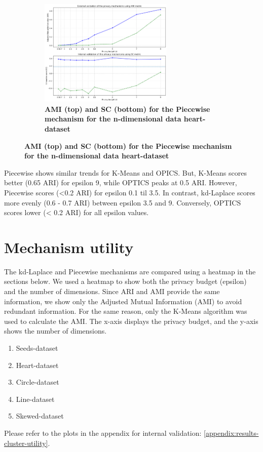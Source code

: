 \begin{figure}[H]
    \begin{subfigure}{1\textwidth}
        \centering
        \includegraphics[width=0.70\textwidth]{Results/kd-laplace/piecewise/heart-dataset/ami-and-sc_10_dimensions.png}
        \caption{\textbf{AMI (top) and SC (bottom) for the Piecewise mechanism for the n-dimensional data heart-dataset}}
    \end{subfigure}
    \label{fig:validation-heart-dataset_comparison_nd-laplace}
\end{figure}

Piecewise shows similar trends for K-Means and OPICS. But, K-Means scores better (0.65 ARI) for epsilon 9, while OPTICS peaks at 0.5 ARI.
However, Piecewise scores (<0.2 ARI) for epsilon 0.1 til 3.5.
In contrast, kd-Laplace scores more evenly (0.6 - 0.7 ARI) between epsilon 3.5 and 9. Conversely, OPTICS scores lower (< 0.2 ARI) for all epsilon values.
\newpage
\section{Mechanism utility}
The kd-Laplace and Piecewise mechanisms are compared using a heatmap in the sections below.
We used a heatmap to show both the privacy budget (epsilon) and the number of dimensions.
Since ARI and AMI provide the same information, we show only the Adjusted Mutual Information (AMI) to avoid redundant information.
For the same reason, only the K-Means algorithm was used to calculate the AMI.
The x-axis displays the privacy budget, and the y-axis shows the number of dimensions.
\begin{enumerate}
    \item Seeds-dataset
    \item Heart-dataset
    \item Circle-dataset
    \item Line-dataset
    \item Skewed-dataset
\end{enumerate}
Please refer to the plots in the appendix for internal validation: \ref{appendix:results-cluster-utility}.
\newpage
